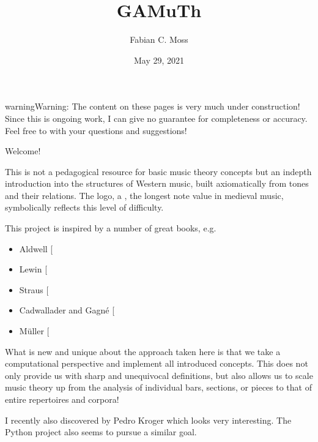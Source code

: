 \documentclass[letterpaper,10pt,english]{sphinxmanual}
\title{GAMuTh}
\date{May 29, 2021}
\author{Fabian C.\@{} Moss}
\begin{document}
\pagestyle{empty}
\sphinxmaketitle
\pagestyle{plain}
\sphinxtableofcontents
\pagestyle{normal}
\label{\detokenize{index::doc}}


\begin{sphinxadmonition}{warning}{Warning:}
The content on these pages is very much under construction!
Since this is ongoing work, I can give no guarantee for completeness or accuracy.
Feel free to  with your questions and suggestions!
\end{sphinxadmonition}

Welcome!

This is not a pedagogical resource for basic music theory concepts
but an in\sphinxhyphen{}depth introduction into the structures of Western music,
built axiomatically from tones and their relations.
The logo, a , the longest note value in medieval music,
symbolically reflects this level of difficulty.

This project is inspired by a number of great books, e.g.
\begin{itemize}
\item {} 
Aldwell  {[}\sphinxcite{8_bibliography:id4}{]}

\item {} 
Lewin {[}\sphinxcite{8_bibliography:id2}{]}

\item {} 
Straus {[}\sphinxcite{8_bibliography:id3}{]}

\item {} 
Cadwallader and Gagné {[}\sphinxcite{8_bibliography:id5}{]}

\item {} 
Müller {[}\sphinxcite{8_bibliography:id6}{]}

\end{itemize}

What is new and unique about the approach taken here is that we take
a computational perspective and implement all introduced concepts.
This does not only provide us with sharp and unequivocal definitions,
but also allows us to scale music theory up from the analysis of individual
bars, sections, or pieces to that of entire repertoires and corpora!

I recently also discovered  by Pedro Kroger
which looks very interesting.
The Python project  also seems to pursue a similar goal.
\end{document}
